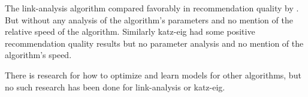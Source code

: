 The link-analysis algorithm compared favorably in recommendation quality by \citep{huang2007comparison}. But without any analysis of the algorithm's parameters and no mention of the relative speed of the algorithm.  Similarly katz-eig had some positive recommendation quality results \citep{shin2012multi} but no parameter analysis and no mention of the algorithm's speed.

There is research for how to optimize and learn models for other algorithms, but no such research has been done for link-analysis or katz-eig.




